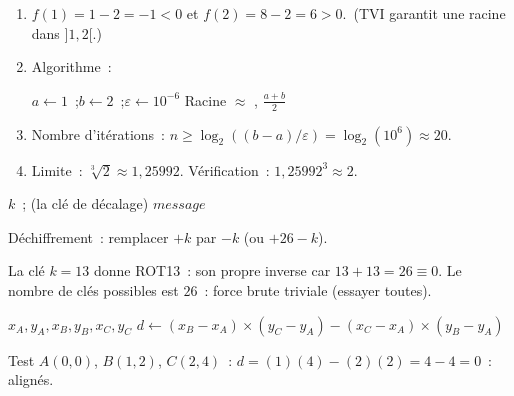 
\begin{enumerate}
  \item $f(1)=1-2=-1<0$ et $f(2)=8-2=6>0$.\checkmark\ (TVI garantit une racine dans $]1,2[$.)
  \item Algorithme~:
\begin{algorithm}[H]
\caption{Dichotomie pour $f(x)=x^3-2$}
$a \leftarrow 1$~;\quad $b \leftarrow 2$~;\quad $\varepsilon \leftarrow 10^{-6}$\;
\Afficher \og Racine $\approx$ \fg, $\frac{a+b}{2}$\;
\end{algorithm}
  \item Nombre d'it\'erations~: $n \geq \log_2((b-a)/\varepsilon)=\log_2(10^6)\approx20$.
  \item Limite~: $\sqrt[3]{2}\approx1{,}25992$. V\'erification~: $1{,}25992^3\approx2$.\checkmark
\end{enumerate}


\begin{algorithm}[H]
\caption{Chiffrement de C\'esar}
\Lire $k$~; (la cl\'e de d\'ecalage)\;
\Lire $\mathit{message}$\;
\end{algorithm}

D\'echiffrement~: remplacer $+k$ par $-k$ (ou $+26-k$).

La cl\'e $k=13$ donne ROT13~: son propre inverse car $13+13=26\equiv0$.
Le nombre de cl\'es possibles est $26$~: force brute triviale (essayer toutes).


\begin{algorithm}[H]
\caption{Test d'alignement}
\Lire $x_A, y_A, x_B, y_B, x_C, y_C$\;
$d \leftarrow (x_B-x_A)\times(y_C-y_A) - (x_C-x_A)\times(y_B-y_A)$\;
\end{algorithm}

Test $A(0,0)$, $B(1,2)$, $C(2,4)$~:
$d=(1)(4)-(2)(2)=4-4=0$~: align\'es.\checkmark

